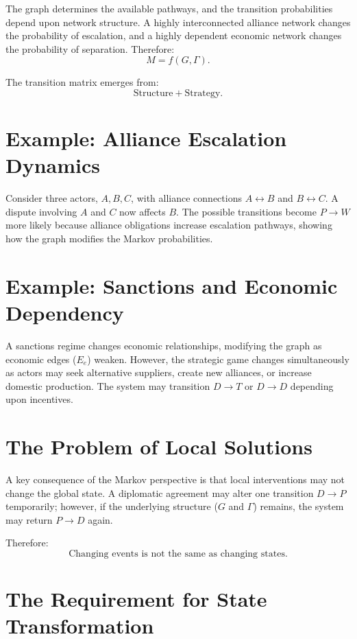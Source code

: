 \documentclass[11pt,openany]{book}
\theoremstyle{plain}
\theoremstyle{definition}
\begin{document}
The graph determines the available pathways, and the transition probabilities depend upon network structure. A highly interconnected alliance network changes the probability of escalation, and a highly dependent economic network changes the probability of separation. Therefore:
\[
M = f(G, \Gamma).
\]

The transition matrix emerges from:
\[
\boxed{
\text{Structure} + \text{Strategy}.
}
\]

\section*{Example: Alliance Escalation Dynamics}

Consider three actors, \(A, B, C\), with alliance connections \(A \leftrightarrow B\) and \(B \leftrightarrow C\). A dispute involving \(A\) and \(C\) now affects \(B\). The possible transitions become \(P \to W\) more likely because alliance obligations increase escalation pathways, showing how the graph modifies the Markov probabilities.

\section*{Example: Sanctions and Economic Dependency}

A sanctions regime changes economic relationships, modifying the graph as economic edges (\(E_e\)) weaken. However, the strategic game changes simultaneously as actors may seek alternative suppliers, create new alliances, or increase domestic production. The system may transition \(D \to T\) or \(D \to D\) depending upon incentives.

\section*{The Problem of Local Solutions}

A key consequence of the Markov perspective is that local interventions may not change the global state. A diplomatic agreement may alter one transition \(D \to P\) temporarily; however, if the underlying structure (\(G\) and \(\Gamma\)) remains, the system may return \(P \to D\) again. 

Therefore:
\[
\boxed{
\text{Changing events is not the same as changing states.}
}
\]

\section*{The Requirement for State Transformation}
\end{document}
